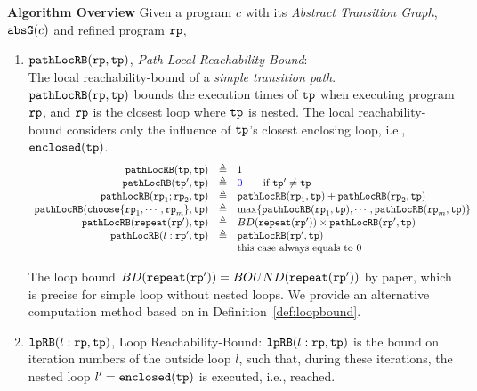 \textbf{Algorithm Overview} 
Given a program $c$ with its \emph{Abstract Transition Graph}, $\mathtt{abs}{\mathtt{G}}(c)$ and refined program $\mathtt{rp}$,
\begin{enumerate}
  \item $\mathtt{pathLocRB}(\mathtt{rp}, \mathtt{tp})$, \emph{Path Local Reachability-Bound}:
  \\
  The local reachability-bound of a \emph{simple transition path}. 
  \\
  $\mathtt{pathLocRB}(\mathtt{rp}, \mathtt{tp})$ bounds the execution times of $\mathtt{tp}$ when executing program $\mathtt{rp}$,
  and $\mathtt{rp}$ is the closest loop where $\mathtt{tp}$ is nested.
  The local reachability-bound  considers only the influence of $\mathtt{tp}$'s closest enclosing loop, i.e., $\mathtt{enclosed}(\mathtt{tp})$.
  \[
    \begin{array}{rcl}
      \outinB(\tpath, \tpath) & \triangleq & 1 \\
      \outinB(\tpath', \tpath) & \triangleq & \highlight{0} \qquad \text{if } \tpath' \neq \tpath\\
      \outinB(\rprog_1;\rprog_2, \tpath) & \triangleq & \outinB(\rprog_1, \tpath) + \outinB(\rprog_2, \tpath) \\
      \outinB(\rpchoose{\rprog_1, \cdots, \rprog_m }, \tpath) & \triangleq 
      & \max\left\{ \outinB(\rprog_1, \tpath), \cdots, \outinB(\rprog_m, \tpath) \right\} \\
      \outinB(\rprepeat(\rprog'), \tpath) & \triangleq 
      & BD(\rprepeat(\rprog'))
       \times \outinB(\rprog', \tpath)
       \\
      \outinB(l: \rprog', \tpath) & \triangleq & \outinB(\rprog', \tpath) \\
      &  & \text{this case always equals to } 0 \\
    \end{array}
    \]
  
    The loop bound $BD(\mathtt{repeat}(\mathtt{rp}')) = BOUND(\mathtt{repeat}(\mathtt{rp}'))$ by paper\cite{GulwaniJK09}, which is precise for simple loop without nested loops. 
    We provide an alternative computation method based on \cite{sinn2017complexity} in Definition~\ref{def:loopbound}.
    \item $\mathtt{lpRB}(l: \mathtt{rp}, \mathtt{tp})$,
    {Loop Reachability-Bound}:
      $\mathtt{lpRB}(l: \mathtt{rp}, \mathtt{tp})$
      is the bound on iteration numbers of the outside loop $l$,
      such that,
      during these iterations, the nested loop $l' = \mathtt{enclosed(\mathtt{tp})}$ is executed, i.e., reached.
      

\end{enumerate}
